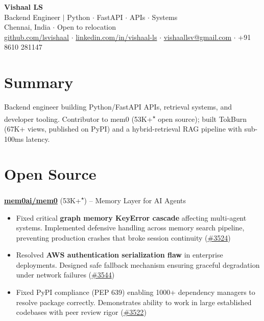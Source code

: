 \documentclass[10pt,letterpaper]{article}
\newcommand{\headerlink}[2]{\href{#1}{#2}}
\begin{document}
\begin{center}
  {\Huge \textbf{Vishaal LS}}\\[2pt]
  {\large Backend Engineer $\vert$ Python $\cdot$ FastAPI $\cdot$ APIs $\cdot$ Systems}\\[2pt]
  {\small Chennai, India $\cdot$ Open to relocation}\\[2pt]
  {\small
    \headerlink{https://github.com/lsvishaal}{github.com/lsvishaal} $\cdot$
    \headerlink{https://www.linkedin.com/in/vishaal-ls-439196181}{linkedin.com/in/vishaal-ls} $\cdot$
    \headerlink{mailto:vishaallsv@gmail.com}{vishaallsv@gmail.com} $\cdot$
    +91 8610 281147
  }
\end{center}

\section*{Summary}
Backend engineer building Python/FastAPI APIs, retrieval systems, and developer tooling. Contributor to mem0 (53K+\textsuperscript{$\star$} open source); built TokBurn (67K+ views, published on PyPI) and a hybrid-retrieval RAG pipeline with sub-100ms latency.

\section*{Open Source}
\textbf{\headerlink{https://github.com/mem0ai/mem0}{mem0ai/mem0}} (53K+\textsuperscript{$\star$}) -- Memory Layer for AI Agents
\begin{itemize}
  \item Fixed critical \textbf{graph memory KeyError cascade} affecting multi-agent systems. Implemented defensive handling across memory search pipeline, preventing production crashes that broke session continuity (\headerlink{https://github.com/mem0ai/mem0/pull/3524}{\#3524})
  \item Resolved \textbf{AWS authentication serialization flaw} in enterprise deployments. Designed safe fallback mechanism ensuring graceful degradation under network failures (\headerlink{https://github.com/mem0ai/mem0/pull/3544}{\#3544})
  \item Fixed PyPI compliance (PEP 639) enabling 1000+ dependency managers to resolve package correctly. Demonstrates ability to work in large established codebases with peer review rigor (\headerlink{https://github.com/mem0ai/mem0/pull/3522}{\#3522})
\end{itemize}
\end{document}
